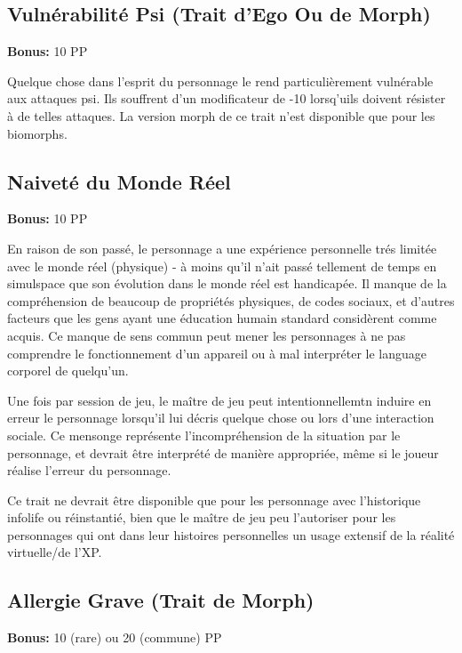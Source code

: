 \subsection{Vulnérabilité Psi (Trait d'Ego Ou de Morph)} \label{sec:traits-psi-vulnerability} 

\textbf{Bonus:} 10 PP 

Quelque chose dans l'esprit du personnage le rend particulièrement vulnérable aux attaques psi. Ils souffrent d'un modificateur de -10 lorsq'uils doivent résister à de telles attaques. La version morph de ce trait n'est disponible que pour les biomorphs. 

\subsection{Naiveté du Monde Réel} \label{sec:traits-real-world-naivite} 

\textbf{Bonus:} 10 PP 

En raison de son passé, le personnage a une expérience personnelle trés limitée avec le monde réel (physique) - à moins qu'il n'ait passé tellement de temps en simulspace que son évolution dans le monde réel est handicapée. Il manque de la compréhension de beaucoup de propriétés physiques, de codes sociaux, et d'autres facteurs que les gens ayant une éducation humain standard considèrent comme acquis. Ce manque de sens commun peut mener les personnages à ne pas comprendre le fonctionnement d'un appareil ou à mal interpréter le language corporel de quelqu'un. 

Une fois par session de jeu, le maître de jeu peut intentionnellemtn induire en erreur le personnage lorsqu'il lui décris quelque chose ou lors d'une interaction sociale. Ce mensonge représente l'incompréhension de la situation par le personnage, et devrait être interprété de manière appropriée, même si le joueur réalise l'erreur du personnage. 

Ce trait ne devrait être disponible que pour les personnage avec l'historique infolife ou réinstantié, bien que le maître de jeu peu l'autoriser pour les personnages qui ont dans leur histoires personnelles un usage extensif de la réalité virtuelle/de l'XP. 

\subsection{Allergie Grave (Trait de Morph)} \label{sec:traits-severe-allergy} 

\textbf{Bonus:} 10 (rare) ou 20 (commune) PP 

